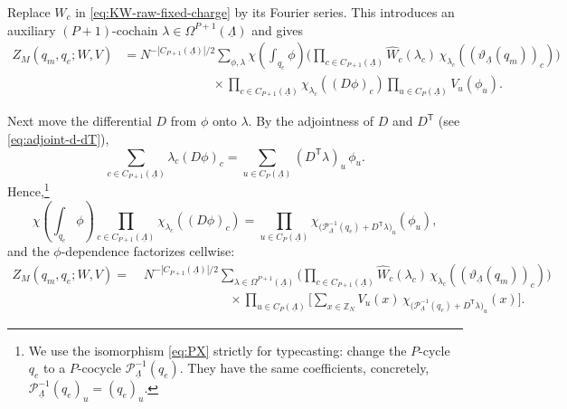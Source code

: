 Replace \(W_c\) in \eqref{eq:KW-raw-fixed-charge} by its Fourier series. This introduces an
auxiliary \((P+1)\)-cochain $\lambda\in \Omega^{P+1}(\underline\Lambda)$ and gives
\begin{equation}
	\begin{aligned}
		Z_M(q_m,q_e;W,V)
		&=
		N^{-|C_{P+1}(\underline\Lambda)|/2}
		\sum_{\phi,\lambda}
		\chi \left(\int_{q_e}\phi\right)
		\Biggl(
		\prod_{c\in C_{P+1}(\underline\Lambda)}
		\widehat W_c(\lambda_c)\,
		\chi_{\lambda_c} \left((\vartheta_{\underline\Lambda}(q_m))_c\right)
		\Biggr)
		\\
		&\hspace{7em}\times
		\prod_{c\in C_{P+1}(\underline\Lambda)}
		\chi_{\lambda_c} \left((D\phi)_c\right)
		\prod_{u\in C_P(\underline\Lambda)}V_u(\phi_u).
	\end{aligned}
	\label{eq:KW-step1}
\end{equation}

Next move the differential \(D\) from \(\phi\) onto \(\lambda\). By the adjointness of
\(D\) and \(D^{\mathsf T}\) (see \eqref{eq:adjoint-d-dT}),
\begin{equation}
	\sum_{c\in C_{P+1}(\underline\Lambda)}\lambda_c(D\phi)_c
	=
	\sum_{u\in C_P(\underline\Lambda)}(D^{\mathsf T}\lambda)_u\,\phi_u.
	\label{eq:KW-adjointness}
\end{equation}
Hence,\footnote{We use the isomorphism \eqref{eq:PX} strictly for typecasting: change the $P$-cycle $q_e$ to a $P$-cocycle $\mathcal P^{-1}_{\underline\Lambda}(q_e)$. They have the same coefficients, concretely, $\mathcal P_{\underline\Lambda}^{-1}(q_e)_u = (q_e)_u$.}
\begin{equation}
	\chi \left(\int_{q_e}\phi\right)
	\prod_{c\in C_{P+1}(\underline\Lambda)}\chi_{\lambda_c} \left((D\phi)_c\right)
	=
	\prod_{u\in C_P(\underline\Lambda)}
	\chi_{\bigl(\mathcal P_{\underline\Lambda}^{-1}(q_e)+D^{\mathsf T}\lambda\bigr)_u}(\phi_u),
\end{equation}
and the \(\phi\)-dependence factorizes cellwise:
\begin{equation}
	\begin{aligned}
		Z_M(q_m,q_e;W,V)
		=&\;
		N^{-|C_{P+1}(\underline\Lambda)|/2}
		\sum_{\lambda\in \Omega^{P+1}(\underline\Lambda)}
		\Biggl(
		\prod_{c\in C_{P+1}(\underline\Lambda)}
		\widehat W_c(\lambda_c)\,
		\chi_{\lambda_c} \left((\vartheta_{\underline\Lambda}(q_m))_c\right)
		\Biggr)
		\\
		&\hspace{7em}\times
		\prod_{u\in C_P(\underline\Lambda)}
		\Biggl[
		\sum_{x\in \mathbb Z_N}
		V_u(x)\,\chi_{\bigl(\mathcal P_{\underline\Lambda}^{-1}(q_e)+D^{\mathsf T}\lambda\bigr)_u}(x)
		\Biggr].
	\end{aligned}
	\label{eq:KW-step2}
\end{equation}

